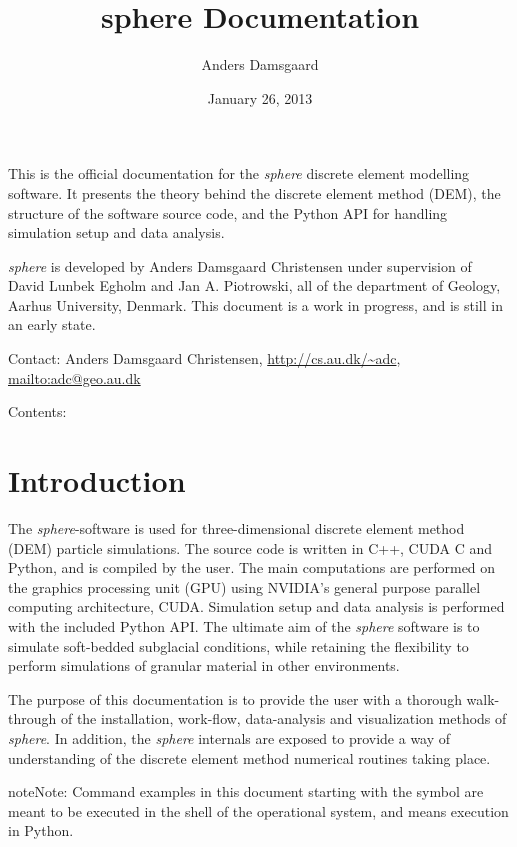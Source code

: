 \documentclass[letterpaper,10pt,english]{sphinxmanual}
\title{sphere Documentation}
\date{January 26, 2013}
\author{Anders Damsgaard}
\begin{document}
\maketitle
\tableofcontents
{}\label{index::doc}


This is the official documentation for the \emph{sphere} discrete element modelling software. It presents the theory behind the discrete element method (DEM), the structure of the software source code, and the Python API for handling simulation setup and data analysis.

\emph{sphere} is developed by Anders Damsgaard Christensen under supervision of David Lunbek Egholm and Jan A. Piotrowski, all of the department of Geology, Aarhus University, Denmark. This document is a work in progress, and is still in an early state.

Contact: Anders Damsgaard Christensen, \href{http://cs.au.dk/~adc}{http://cs.au.dk/\textasciitilde{}adc}, \href{mailto:adc@geo.au.dk}{mailto:adc@geo.au.dk}

Contents:


\chapter{Introduction}
\label{introduction:welcome-to-sphere-s-documentation}\label{introduction:introduction}\label{introduction::doc}
The \emph{sphere}-software is used for three-dimensional discrete element method (DEM) particle simulations. The source code is written in C++, CUDA C and Python, and is compiled by the user. The main computations are performed on the graphics processing unit (GPU) using NVIDIA's general purpose parallel computing architecture, CUDA. Simulation setup and data analysis is performed with the included Python API.
The ultimate aim of the \emph{sphere} software is to simulate soft-bedded subglacial conditions, while retaining the flexibility to perform simulations of granular material in other environments.

The purpose of this documentation is to provide the user with a thorough walk-through of the installation, work-flow, data-analysis and visualization methods of \emph{sphere}. In addition, the \emph{sphere} internals are exposed to provide a way of understanding of the discrete element method numerical routines taking place.

\begin{notice}{note}{Note:}
Command examples in this document starting with the symbol \code{\$} are meant to be executed in the shell of the operational system, and \code{\textgreater{}\textgreater{}\textgreater{}} means execution in Python.
\end{notice}
\end{document}
